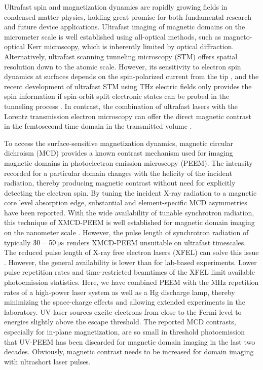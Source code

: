 \documentclass[prl,twocolumn,floatfix,superscriptaddress,aps]{revtex4-2}
\begin{document}
\maketitle
Ultrafast spin and magnetization dynamics are rapidly growing fields in condensed matter physics, holding great promise for both fundamental research and future device applications. Ultrafast imaging of magnetic domains on the micrometer scale is well established using all-optical methods, such as magneto-optical Kerr microscopy, which is inherently limited by optical diffraction. 
Alternatively, ultrafast scanning tunneling microscopy (STM) offers spatial resolution down to the atomic scale. However, its sensitivity to electron spin dynamics at surfaces depends on the spin-polarized current from the tip \cite{yoshida14}, and the recent development of ultrafast STM using THz electric fields \cite{mueller24} only provides the spin information if spin-orbit split electronic states can be probed in the tunneling process \cite{roelcke24}. In contrast, the combination of ultrafast lasers with the Lorentz transmission electron microscopy can offer the direct magnetic contrast in the femtosecond time domain in the transmitted volume \cite{daSilva18, moeller20, tengdin20}.

To access the surface-sensitive magnetization dynamics, magnetic circular dichroism (MCD) provides a known contrast mechanism used for imaging magnetic domains in photoelectron emission microscopy (PEEM). The intensity recorded for a particular domain changes with the helicity of the incident radiation, thereby producing magnetic contrast without need for explicitly detecting the electron spin. By tuning the incident X-ray radiation to a magnetic core level absorption edge, substantial and element-specific MCD asymmetries have been reported. With the wide availability of tunable synchrotron radiation, this technique of XMCD-PEEM is well established for magnetic domain imaging on the nanometer scale \cite{kuch15}. However, the pulse length of synchrotron radiation of typically $\unit[30-50]{ps}$ renders XMCD-PEEM unsuitable on ultrafast timescales. 
The reduced pulse length of X-ray free electron lasers (XFEL) can solve this issue \cite{Kutnyakhov20}. However, the general availability is lower than for lab-based experiments. Lower pulse repetition rates and time-restricted beamtimes of the XFEL limit available photoemission statistics. Here, we have combined PEEM with the MHz repetition rates of a high-power laser system as well as a Hg discharge lamp, thereby minimizing the space-charge effects and allowing extended experiments in the laboratory. UV laser sources excite electrons from close to the Fermi level to energies slightly above the escape threshold. The reported MCD contrasts, especially for in-plane magnetization, are so small in threshold photoemission \cite{marx2000} that UV-PEEM has been discarded for magnetic domain imaging in the last two decades. Obviously, magnetic contrast needs to be increased for domain imaging with ultrashort laser pulses.
\end{document}
